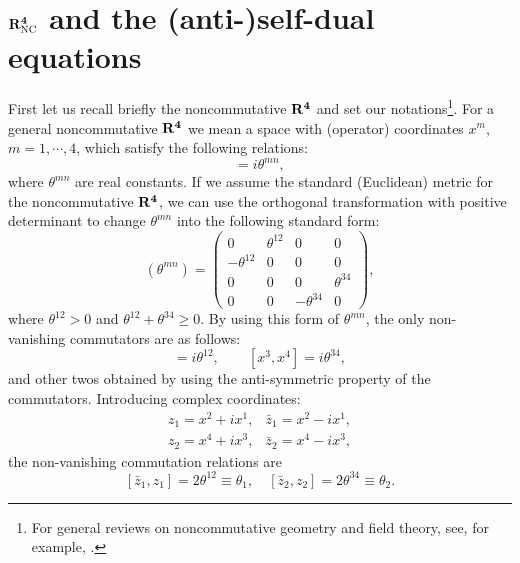 \documentclass[a4paper,a4paper]{article}
\begin{document}
\section{$\bf{R}_{\rm  NC}^4$ and the (anti-)self-dual equations}
First let us recall briefly the noncommutative $\bf{R}^4$ and set
our notations\footnote{For general reviews on noncommutative
geometry and field theory, see, for example, \cite{Paperc,
Reviewa, Harvey, Reviewb, Reviewc}.}. For a general noncommutative
$\bf{R}^4$ we mean a space with (operator) coordinates $x^m$,
$m=1, \cdots, 4$, which satisfy the following relations:
\begin{equation}
[x^m,x^n] = i \theta^{mn},
\end{equation}
where $\theta^{mn}$ are real constants. If we assume the standard
(Euclidean) metric for the noncommutative $\bf{R}^4$, we
can use the orthogonal transformation with positive determinant to
change $\theta^{mn}$ into the following standard form:
\begin{equation}
\label{theta} (\theta^{mn})=\left(\begin{array}{cccc} 0 &
\theta^{12} & 0 & 0 \\ -\theta^{12}& 0 & 0 & 0 \\ 0 & 0 & 0
&\theta^{34}\\ 0 & 0 & -\theta^{34}& 0 \end{array}\right),
\end{equation}
where $\theta^{12}>0$ and $\theta^{12}+\theta^{34}\geq 0$. By
using this form of $\theta^{mn}$, the only non-vanishing
commutators are as follows:
\begin{equation}
[x^1,x^2] = i \theta^{12}, \qquad [x^3,x^4] = i \theta^{34},
\end{equation}
and other twos obtained by using the anti-symmetric property of
the commutators. Introducing complex coordinates:
\begin{equation}
\label{complex}
\begin{array}{rl}
z_1 = x^2 + i x^1 , & \bar{z}_1 = x^2 - i x^1, \\
z_2 = x^4 + i x^3 , & \bar{z}_2 = x^4 - i x^3,
\end{array}
\end{equation}
the non-vanishing commutation relations are
\begin{equation}
\label{commutator of z}
[\bar z_1,z_1]=2\theta^{12}\equiv\theta_1,\quad [\bar z_2,z_2]
=2\theta^{34}\equiv\theta_2.
\end{equation}
\end{document}
